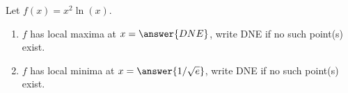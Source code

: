 \documentclass{ximera}
\author{Gregory Hartman \and Matthew Carr}
\begin{document}
\begin{exercise}






Let $f(x)=x^{2}\ln(x)$.
\begin{enumerate}
\item		$f$ has local maxima at $x=\answer{DNE}$, write DNE if no such point(s) exist.
\item		$f$ has local minima at $x=\answer{1/\sqrt{e}}$, write DNE if no such point(s) exist.
\end{enumerate}

\end{exercise}
\end{document}
